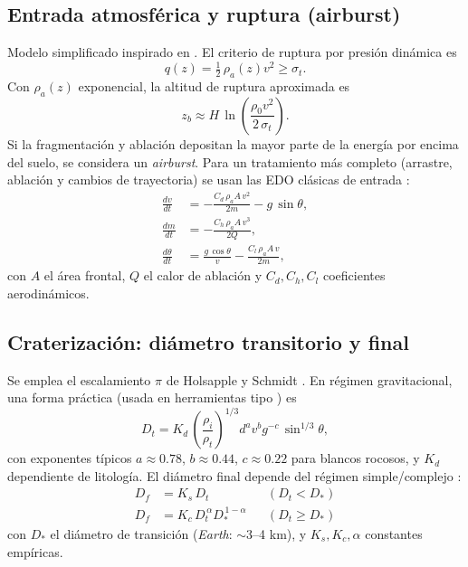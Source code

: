 \documentclass[conference]{IEEEtran}
\begin{document}
\subsection{Entrada atmosférica y ruptura (airburst)}
Modelo simplificado inspirado en \cite{collins2005,chyba1993,popova2013}. El criterio de ruptura por presión dinámica es
\begin{equation}
    q(z) = \tfrac{1}{2} \, \rho_a(z) v^2 \geq \sigma_t.
\end{equation}
Con $\rho_a(z)$ exponencial, la altitud de ruptura aproximada es
\begin{equation}
    z_b \approx H \, \ln\!\left( \frac{\rho_0 v^2}{2\,\sigma_t} \right).
\end{equation}
Si la fragmentación y ablación depositan la mayor parte de la energía por encima del suelo, se considera un \emph{airburst}. Para un tratamiento más completo (arrastre, ablación y cambios de trayectoria) se usan las EDO clásicas de entrada \cite{collins2005,chyba1993}:
\begin{align}
    \frac{dv}{dt} &= -\frac{C_d \, \rho_a A \, v^2}{2 m} - g\,\sin\theta, \\
    \frac{dm}{dt} &= -\frac{C_h \, \rho_a A \, v^3}{2 Q}, \\
    \frac{d\theta}{dt} &= \frac{g\,\cos\theta}{v} - \frac{C_l \, \rho_a A \, v}{2 m},
\end{align}
con $A$ el área frontal, $Q$ el calor de ablación y $C_d, C_h, C_l$ coeficientes aerodinámicos.

\subsection{Craterización: diámetro transitorio y final}
Se emplea el escalamiento $\pi$ de Holsapple y Schmidt \cite{holsapple1993,melosh1989,housen2011}. En régimen gravitacional, una forma práctica (usada en herramientas tipo \cite{collins2005}) es
\begin{equation}
    D_t = K_d \, \left(\frac{\rho_i}{\rho_t}\right)^{1/3} d^{a} v^{b} g^{-c} \, \sin^{1/3}\!\theta,
\end{equation}
con exponentes típicos $a\approx0.78$, $b\approx0.44$, $c\approx0.22$ para blancos rocosos, y $K_d$ dependiente de litología. El diámetro final depende del régimen simple/complejo \cite{melosh1989}:
\begin{align}
    D_f &= K_s \, D_t && (D_t < D_*)\\
    D_f &= K_c \, D_t^{\,\alpha} D_*^{\,1-\alpha} && (D_t \ge D_*)
\end{align}
con $D_*$ el diámetro de transición (\emph{Earth}: $\sim$3--4 km), y $K_s, K_c, \alpha$ constantes empíricas.
\end{document}
